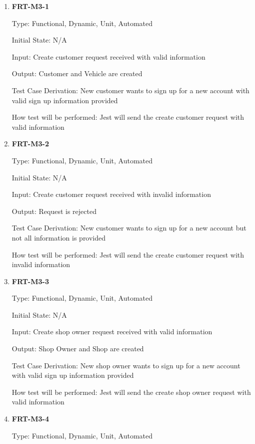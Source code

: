 \documentclass[12pt, titlepage]{article}
\begin{document}
\begin{enumerate}

	\item \textbf{FRT-M3-1}

	      Type: Functional, Dynamic, Unit, Automated

	      Initial State: N/A

	      Input: Create customer request received with valid information

	      Output: Customer and Vehicle are created

	      Test Case Derivation: New customer wants to sign up for a new account with valid sign up
	      information provided

	      How test will be performed: Jest will send the create customer request with valid information

	\item \textbf{FRT-M3-2}

	      Type: Functional, Dynamic, Unit, Automated

	      Initial State: N/A

	      Input: Create customer request received with invalid information

	      Output: Request is rejected

	      Test Case Derivation: New customer wants to sign up for a new account but not all information is
	      provided

	      How test will be performed: Jest will send the create customer request with invalid information

	\item \textbf{FRT-M3-3}

	      Type: Functional, Dynamic, Unit, Automated

	      Initial State: N/A

	      Input: Create shop owner request received with valid information

	      Output: Shop Owner and Shop are created

	      Test Case Derivation: New shop owner wants to sign up for a new account with valid sign up
	      information provided

	      How test will be performed: Jest will send the create shop owner request with valid information

	\item \textbf{FRT-M3-4}

	      Type: Functional, Dynamic, Unit, Automated


\end{enumerate}
\end{document}
